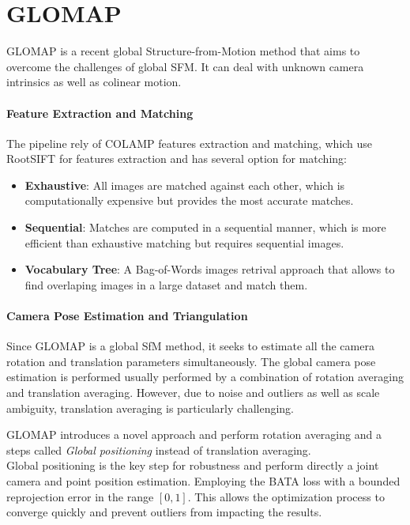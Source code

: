 \section{GLOMAP}\label{sec:glomap}

GLOMAP \cite{pan2024glomap} is a recent global Structure-from-Motion method that aims to overcome the challenges of global SFM. It can deal with unknown camera intrinsics as well as colinear motion.

\paragraph{Feature Extraction and Matching}
The pipeline rely of COLAMP features extraction and matching, which use RootSIFT \cite{arrandjelovic2012three} for features extraction and has several option for matching: 
\begin{itemize}
    \item \textbf{Exhaustive}: All images are matched against each other, which is computationally expensive but provides the most accurate matches.
    \item \textbf{Sequential}: Matches are computed in a sequential manner, which is more efficient than exhaustive matching but requires sequential images.
    \item \textbf{Vocabulary Tree}: A Bag-of-Words images retrival approach \cite{schoenberger2016vote} that allows to find overlaping images in a large dataset and match them.
\end{itemize}

\paragraph{Camera Pose Estimation and Triangulation}
Since GLOMAP is a global SfM method, it seeks to estimate all the camera rotation and translation parameters simultaneously.
The global camera pose estimation is performed usually performed by a combination of rotation averaging and translation averaging. 
However, due to noise and outliers as well as scale ambiguity, translation averaging is particularly challenging.

GLOMAP introduces a novel approach and perform rotation averaging and a steps called \emph{Global positioning} instead of translation averaging. \\
Global positioning is the key step for robustness and perform directly a joint camera and point position estimation. 
Employing the BATA loss \cite{zhuang2019baselinedesensitizingtranslationaveraging} with a bounded reprojection error in the range $[0, 1]$. 
This allows the optimization process to converge quickly and prevent outliers from impacting the results.

